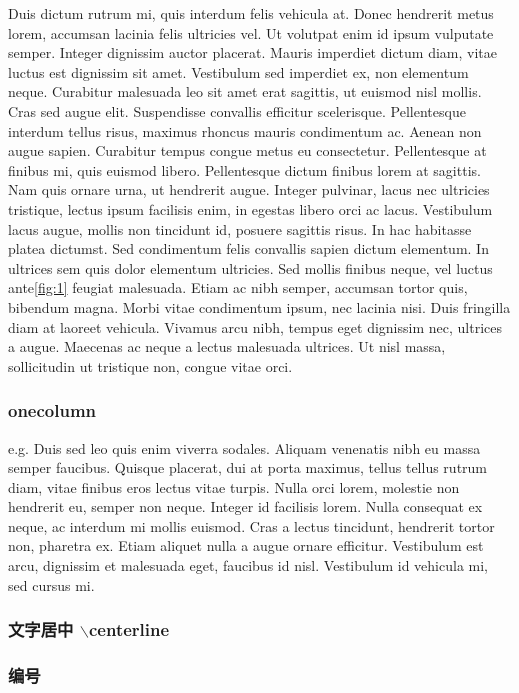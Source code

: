 \documentclass{article}[20pt]{}
\begin{document}
Duis dictum rutrum mi, quis interdum felis vehicula at. Donec hendrerit metus lorem, accumsan lacinia felis ultricies vel. Ut volutpat enim id ipsum vulputate semper. Integer dignissim auctor placerat. Mauris imperdiet dictum diam, vitae luctus est dignissim sit amet. Vestibulum sed imperdiet ex, non elementum neque. Curabitur malesuada leo sit amet erat sagittis, ut euismod nisl mollis. Cras sed augue elit. Suspendisse convallis efficitur scelerisque. Pellentesque interdum tellus risus, maximus rhoncus mauris condimentum ac. Aenean non augue sapien. Curabitur tempus congue metus eu consectetur. Pellentesque at finibus mi, quis euismod libero.
Pellentesque dictum finibus lorem at sagittis. Nam quis ornare urna, ut hendrerit augue. Integer pulvinar, lacus nec ultricies tristique, lectus ipsum facilisis enim, in egestas libero orci ac lacus. Vestibulum lacus augue, mollis non tincidunt id, posuere sagittis risus. In hac habitasse platea dictumst. Sed condimentum felis convallis sapien dictum elementum. In ultrices sem quis dolor elementum ultricies. Sed mollis finibus neque, vel luctus ante\ref{fig:1} feugiat malesuada. Etiam ac nibh semper, accumsan tortor quis, bibendum magna. Morbi vitae condimentum ipsum, nec lacinia nisi. Duis fringilla diam at laoreet vehicula. Vivamus arcu nibh, tempus eget dignissim nec, ultrices a augue. Maecenas ac neque a lectus malesuada ultrices. Ut nisl massa, sollicitudin ut tristique non, congue vitae orci.

\subsubsection{onecolumn}e.g.
\onecolumn
Duis sed leo quis enim viverra sodales. Aliquam venenatis nibh eu massa semper faucibus. Quisque placerat, dui at porta maximus, tellus tellus rutrum diam, vitae finibus eros lectus vitae turpis. Nulla orci lorem, molestie non hendrerit eu, semper non neque. Integer id facilisis lorem. Nulla consequat ex neque, ac interdum mi mollis euismod. Cras a lectus tincidunt, hendrerit tortor non, pharetra ex. Etiam aliquet nulla a augue ornare efficitur. Vestibulum est arcu, dignissim et malesuada eget, faucibus id nisl. Vestibulum id vehicula mi, sed cursus mi.
\subsubsection{文字居中 $\backslash$centerline}
\subsubsection{编号}
\end{document}
